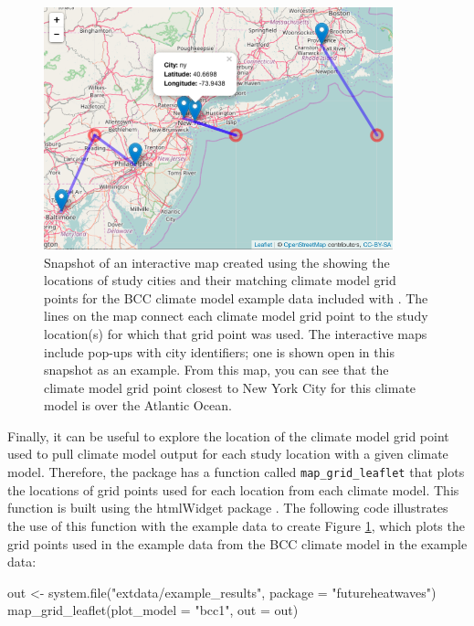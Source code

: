 \begin{figure}
\begin{center}
\includegraphics[width = 0.9\textwidth]{ExampleLeaflet}
\end{center}
\caption{Snapshot of an interactive map created using the  showing the locations of study cities and their matching climate model grid points for the BCC climate model example data included with . The lines on the map connect each climate model grid point to the study location(s) for which that grid point was used. The interactive maps include pop-ups with city identifiers; one is shown open in this snapshot as an example. From this map, you can see that the climate model grid point closest to New York City for this climate model is over the Atlantic Ocean.}
\label{fig:gridmap}
\end{figure}

Finally, it can be useful to explore the location of the climate model
grid point used to pull climate model output for each study location
with a given climate model. Therefore, the package has a function called
\texttt{map\_grid\_leaflet} that plots the locations of grid points used
for each location from each climate model. This function is built using
the htmlWidget  package \citep{leaflet}. The following
code illustrates the use of this function with the example data to
create Figure \ref{fig:gridmap}, which plots the grid points used in the
example data from the BCC climate model in the example data:

\begin{Schunk}
\begin{Sinput}
out <- system.file("extdata/example_results", package = "futureheatwaves")
map_grid_leaflet(plot_model = "bcc1", out = out)
\end{Sinput}
\end{Schunk}


